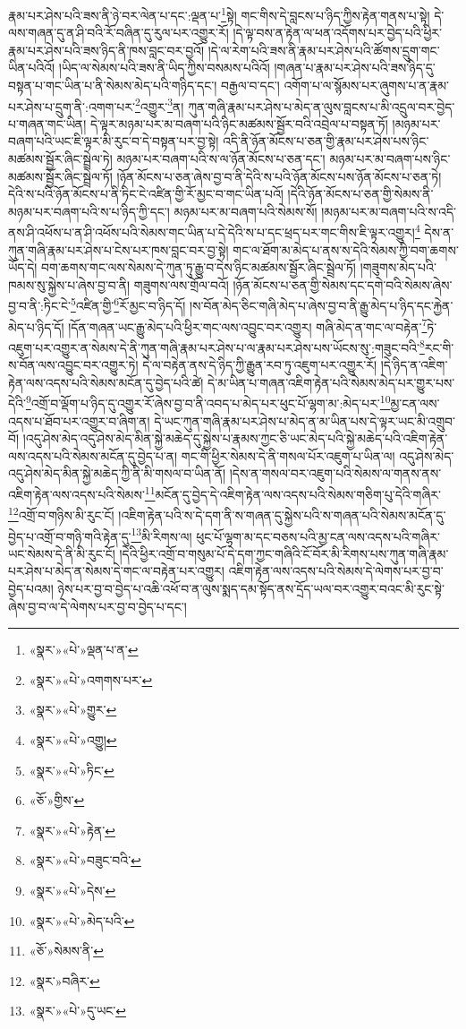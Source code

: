རྣམ་པར་ཤེས་པའི་ཟས་ནི་ཉེ་བར་ལེན་པ་དང་:ལྡན་པ་\footnote{«སྣར་»«པེ་»ལྡན་པ་ན་}སྟེ། གང་གིས་དེ་བླངས་པ་ཉིད་ཀྱིས་རྟེན་གནས་པ་སྟེ། དེ་ལས་གཞན་དུ་ན་ཤི་བའི་རོ་བཞིན་དུ་རུལ་པར་འགྱུར་རོ། །དེ་ལྟ་བས་ན་རྟེན་ལ་ཕན་འདོགས་པར་བྱེད་པའི་ཕྱིར་རྣམ་པར་ཤེས་པའི་ཟས་ཉིད་ནི་ཁས་བླང་བར་བྱའོ། །དེ་ལ་རེག་པའི་ཟས་ནི་རྣམ་པར་ཤེས་པའི་ཚོགས་དྲུག་གང་ཡིན་པའིའོ། །ཡིད་ལ་སེམས་པའི་ཟས་ནི་ཡིད་ཀྱིས་བསམས་པའིའོ། །གཞན་པ་རྣམ་པར་ཤེས་པའི་ཟས་ཉིད་དུ་བསྟན་པ་གང་ཡིན་པ་ནི་སེམས་མེད་པའི་གཉིད་དང་། བརྒྱལ་བ་དང་། འགོག་པ་ལ་སྙོམས་པར་ཞུགས་པ་ན་རྣམ་པར་ཤེས་པ་དྲུག་ནི་:འགག་པར་\footnote{«སྣར་»«པེ་»འགགས་པར་}འགྱུར་\footnote{«སྣར་»«པེ་»གྱུར་}ན། ཀུན་གཞི་རྣམ་པར་ཤེས་པ་མེད་ན་ལུས་བླངས་པ་མི་འདྲུལ་བར་བྱེད་པ་གཞན་གང་ཡིན། དེ་ལྟར་མཉམ་པར་མ་བཞག་པའི་ཉིང་མཚམས་སྦྱོར་བའི་འབྲེལ་པ་བསྟན་ཏོ། །མཉམ་པར་བཞག་པའི་ཡང་ཇི་ལྟར་མི་རུང་བ་དེ་བསྟན་པར་བྱ་སྟེ། འདི་ནི་ཉོན་མོངས་པ་ཅན་གྱི་རྣམ་པར་ཤེས་པས་ཉིང་མཚམས་སྦྱོར་ཞིང་སྦྲེལ་ཏེ། མཉམ་པར་བཞག་པའི་ས་ལ་ཉོན་མོངས་པ་ཅན་དང་། མཉམ་པར་མ་བཞག་པས་ཉིང་མཚམས་སྦྱོར་ཞིང་སྦྲེལ་ཏོ། །ཉོན་མོངས་པ་ཅན་ཞེས་བྱ་བ་ནི་དེའི་ས་པའི་ཉོན་མོངས་པས་ཉོན་མོངས་པ་ཅན་ཏེ། དེའི་ས་པའི་ཉོན་མོངས་པ་ནི་ཏིང་ངེ་འཛིན་གྱི་རོ་མྱང་བ་གང་ཡིན་པའོ། །དེའི་ཉོན་མོངས་པ་ཅན་གྱི་སེམས་ནི་མཉམ་པར་བཞག་པའི་ས་པ་ཉིད་ཀྱི་དང་། མཉམ་པར་མ་བཞག་པའི་སེམས་སོ། །མཉམ་པར་མ་བཞག་པའི་ས་འདི་ནས་ཤི་འཕོས་པ་ན་ཤི་འཕོས་པའི་སེམས་གང་ཡིན་པ་དེ་དེའི་ས་པ་དང་ཕྲད་པར་གང་གིས་ཇི་ལྟར་འགྱུར།\footnote{«སྣར་»«པེ་»འགྱུ།} དེས་ན་ཀུན་གཞི་རྣམ་པར་ཤེས་པ་ངེས་པར་ཁས་བླང་བར་བྱ་སྟེ། གང་ལ་ཐོག་མ་མེད་པ་ནས་ས་དེའི་སེམས་ཀྱི་བག་ཆགས་ཡོད་དེ། བག་ཆགས་གང་ལས་སེམས་དེ་ཀུན་ཏུ་རྒྱུ་བ་དེས་ཉིང་མཚམས་སྦྱོར་ཞིང་སྦྲེལ་ཏོ། །གཟུགས་མེད་པའི་ཁམས་སུ་སྐྱེས་པ་ཞེས་བྱ་བ་ནི། གཟུགས་ལས་གྲོལ་བའོ། །ཉོན་མོངས་པ་ཅན་གྱི་སེམས་དང་དགེ་བའི་སེམས་ཞེས་བྱ་བ་ནི་:ཏིང་ངེ་\footnote{«སྣར་»«པེ་»ཏིང་}འཛིན་གྱི་\footnote{«ཅོ་»གྱིས་}རོ་མྱང་བ་ཉིད་དོ། །ས་བོན་མེད་ཅིང་གཞི་མེད་པ་ཞེས་བྱ་བ་ནི་རྒྱུ་མེད་པ་ཉིད་དང་རྐྱེན་མེད་པ་ཉིད་དོ། །དོན་གཞན་ཡང་རྒྱུ་མེད་པའི་ཕྱིར་གང་ལས་འབྱུང་བར་འགྱུར། གཞི་མེད་ན་གང་ལ་བརྟེན་\footnote{«སྣར་»«པེ་»རྟེན་}ཏེ་འཇུག་པར་འགྱུར་ན་སེམས་དེ་ནི་ཀུན་གཞི་རྣམ་པར་ཤེས་པ་ལ་རྣམ་པར་ཤེས་པས་ཡོངས་སུ་:གཟུང་བའི་\footnote{«སྣར་»«པེ་»བཟུང་བའི་}རང་གི་ས་བོན་ལས་འབྱུང་བར་འགྱུར་ཏེ། དེ་ལ་བརྟེན་ནས་དེ་ཉིད་ཀྱི་རྒྱུན་རབ་ཏུ་འཇུག་པར་འགྱུར་རོ། །དེ་ཉིད་ན་འཇིག་རྟེན་ལས་འདས་པའི་སེམས་མངོན་དུ་བྱེད་པའི་ཚེ། དེ་མ་ཡིན་པ་གཞན་འཇིག་རྟེན་པའི་སེམས་མེད་པར་གྱུར་པས་དེའི་\footnote{«སྣར་»«པེ་»དེས་}འགྲོ་བ་ལྡོག་པ་ཉིད་དུ་འགྱུར་རོ་ཞེས་བྱ་བ་ནི་འབད་པ་མེད་པར་ཕུང་པོ་ལྷག་མ་:མེད་པར་\footnote{«སྣར་»«པེ་»མེད་པའི་}མྱ་ངན་ལས་འདས་པ་ཐོབ་པར་འགྱུར་བ་ཞིག་ན། དེ་ཡང་ཀུན་གཞི་རྣམ་པར་ཤེས་པ་མེད་ན་མ་ཡིན་པས་དེ་ལྟར་ཡང་མི་འགྲུབ་བོ། །འདུ་ཤེས་མེད་འདུ་ཤེས་མེད་མིན་སྐྱེ་མཆེད་དུ་སྐྱེས་པ་རྣམས་ཀྱང་ཅི་ཡང་མེད་པའི་སྐྱེ་མཆེད་པའི་འཇིག་རྟེན་ལས་འདས་པའི་སེམས་མངོན་དུ་བྱེད་པ་ན། གང་གི་ཕྱིར་སེམས་དེ་ནི་གསལ་པོར་འཇུག་པ་ཡིན་ལ། འདུ་ཤེས་མེད་འདུ་ཤེས་མེད་མིན་སྐྱེ་མཆེད་ཀྱི་ནི་མི་གསལ་བ་ཡིན་ནོ། །དེས་ན་གསལ་བར་འཇུག་པའི་སེམས་ལ་གནས་ནས་འཇིག་རྟེན་ལས་འདས་པའི་སེམས་\footnote{«ཅོ་»སེམས་ནི་}མངོན་དུ་བྱེད་དེ་འཇིག་རྟེན་ལས་འདས་པའི་སེམས་གཅིག་པུ་དེའི་གཞིར་\footnote{«སྣར་»བཞིར་}འགྲོ་བ་གཉིས་མི་རུང་ངོ། །འཇིག་རྟེན་པའི་ས་དེ་དག་ནི་ས་གཞན་དུ་སྐྱེས་པའི་ས་གཞན་པའི་སེམས་མངོན་དུ་བྱེད་པ་འགྲོ་བ་གཉི་གའི་རྟེན་དུ་\footnote{«སྣར་»«པེ་»དུ་ཡང་}མི་རིགས་ལ། ཕུང་པོ་ལྷག་མ་དང་བཅས་པའི་མྱ་ངན་ལས་འདས་པའི་གཞིར་ཡང་སེམས་དེ་ནི་མི་རུང་ངོ། །དེའི་ཕྱིར་འགྲོ་བ་གསུམ་པོ་དེ་དག་ཀྱང་གཞིའི་ངོ་བོར་མི་རིགས་པས་ཀུན་གཞི་རྣམ་པར་ཤེས་པ་མེད་ན་སེམས་དེ་གང་ལ་བརྟེན་པར་འགྱུར། འཇིག་རྟེན་ལས་འདས་པའི་སེམས་དེ་ལེགས་པར་བྱ་བ་བྱེད་པའམ། ཉེས་པར་བྱ་བ་བྱེད་པ་འཆི་འཕོ་བ་ན་ལུས་སྨད་དམ་སྟོད་ནས་དྲོད་ཡལ་བར་འགྱུར་བའང་མི་རུང་སྟེ་ཞེས་བྱ་བ་ལ་དེ་ལེགས་པར་བྱ་བ་བྱེད་པ་དང་། 